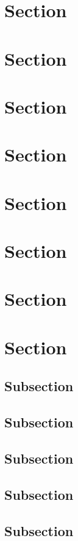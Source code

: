 \documentclass[paper=a5,twoside,fontsize=10pt, DIV=calc, headings=small,bibliography=totoc, listof=totoc]{scrbook}
\begin{document}
\section{Section}

\section{Section}

\section{Section}

\section{Section}

\section{Section}

\section{Section}

\section{Section}

\section{Section}

\subsection{Subsection}
\label{ssec:example}
\blindtext

\subsection{Subsection}
\subsection{Subsection}
\subsection{Subsection}
\subsection{Subsection}
\end{document}

